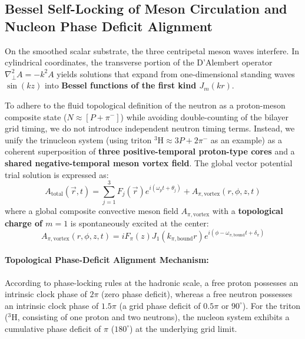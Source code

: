 \documentclass[12pt, a4paper]{article}
\begin{document}
\subsection{Bessel Self-Locking of Meson Circulation and Nucleon Phase Deficit Alignment}

On the smoothed scalar substrate, the three centripetal meson waves interfere. In cylindrical coordinates, the transverse portion of the D'Alembert operator $\nabla_\perp^2 A = -k^2 A$ yields solutions that expand from one-dimensional standing waves $\sin(kz)$ into \textbf{Bessel functions of the first kind $J_m(kr)$}.

To adhere to the fluid topological definition of the neutron as a proton-meson composite state ($N \approx [P + \pi^-]$) while avoiding double-counting of the bilayer grid timing, we do not introduce independent neutron timing terms. Instead, we unify the trinucleon system (using triton ${}^3\text{H} \approx 3P + 2\pi^-$ as an example) as a coherent superposition of \textbf{three positive-temporal proton-type cores} and a \textbf{shared negative-temporal meson vortex field}. The global vector potential trial solution is expressed as:
\begin{equation}
A_{\mathrm{total}}(\vec{r}, t) = \sum_{j=1}^3 F_j(\vec{r}) e^{i(\omega_p t + \theta_j)} + A_{\pi, \mathrm{vortex}}(r, \phi, z, t)
\end{equation}
where a global composite convective meson field $A_{\pi, \mathrm{vortex}}$ with a \textbf{topological charge of $m=1$} is spontaneously excited at the center:
\begin{equation}
A_{\pi, \mathrm{vortex}}(r, \phi, z, t) = i F_\pi(z) J_1(k_{\pi, \mathrm{bound}} r) e^{i(\phi - \omega_{\pi, \mathrm{bound}} t + \delta_{\pi})}
\end{equation}

\paragraph{Topological Phase-Deficit Alignment Mechanism:}
According to phase-locking rules at the hadronic scale, a free proton possesses an intrinsic clock phase of $2\pi$ (zero phase deficit), whereas a free neutron possesses an intrinsic clock phase of $1.5\pi$ (a grid phase deficit of $0.5\pi$ or $90^\circ$). For the triton (${}^3\text{H}$, consisting of one proton and two neutrons), the nucleon system exhibits a cumulative phase deficit of $\pi$ ($180^\circ$) at the underlying grid limit.
\end{document}
